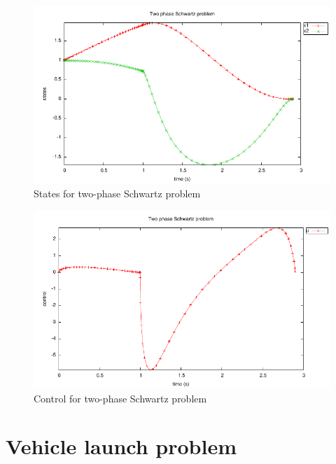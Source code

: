 \documentclass[a4paper,11pt]{report}    %
\begin{document}
\begin{figure}
  \centering 
  \includegraphics{../examples/twophsc/twophsc_states}
  \caption{States for two-phase Schwartz problem}
 \label{fig:tphsc_states}
\end{figure}


\begin{figure}
  \centering
  \includegraphics{../examples/twophsc/twophsc_control}
  \caption{Control for two-phase Schwartz problem}
 \label{fig:tphsc_control}
\end{figure}


\section{Vehicle launch problem}
\end{document}
